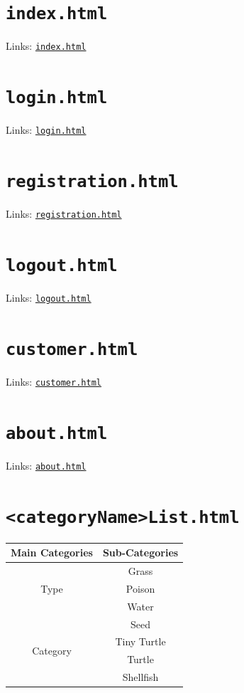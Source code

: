 \documentclass[a4paper,12pt]{article} %
\begin{document}
\section{\texttt{index.html}}
Links: 
\href{../src/index.html}{\texttt{index.html}}


\section{\texttt{login.html}}
Links: 
\href{../src/login.html}{\texttt{login.html}}


\section{\texttt{registration.html}}
Links: 
\href{../src/registration.html}{\texttt{registration.html}}


\section{\texttt{logout.html}}
Links: 
\href{../src/logout.html}{\texttt{logout.html}}


\section{\texttt{customer.html}}
Links: 
\href{../src/customer.html}{\texttt{customer.html}}


\section{\texttt{about.html}}
Links: 
\href{../src/about.html}{\texttt{about.html}}


\section{\texttt{<categoryName>List.html}}

\begin{tabular}{|c|c|}
    \hline
    \textbf{Main Categories} & \textbf{Sub-Categories}\\
    \hline
    \multirow{3}{*}{Type} & Grass \\
    \cline{2-2}
    & Poison \\
    \cline{2-2}
    & Water \\
    \hline
    \multirow{4}{*}{Category} & Seed \\
    \cline{2-2}
    & Tiny Turtle \\
    \cline{2-2}
    & Turtle \\
    \cline{2-2}
    & Shellfish \\
    \hline
\end{tabular}
\end{document}
